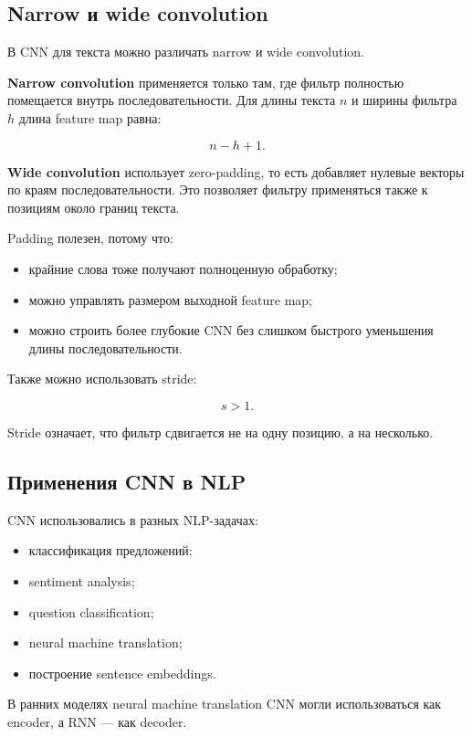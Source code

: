 \documentclass[a4paper,12pt]{article}
\begin{document}
\subsection{Narrow и wide convolution}

В CNN для текста можно различать narrow и wide convolution.

\textbf{Narrow convolution} применяется только там, где фильтр полностью помещается внутрь последовательности. Для длины текста \(n\) и ширины фильтра \(h\) длина feature map равна:

\[
n - h + 1.
\]

\textbf{Wide convolution} использует zero-padding, то есть добавляет нулевые векторы по краям последовательности. Это позволяет фильтру применяться также к позициям около границ текста.

Padding полезен, потому что:

\begin{itemize}
    \item крайние слова тоже получают полноценную обработку;
    \item можно управлять размером выходной feature map;
    \item можно строить более глубокие CNN без слишком быстрого уменьшения длины последовательности.
\end{itemize}

Также можно использовать stride:

\[
s > 1.
\]

Stride означает, что фильтр сдвигается не на одну позицию, а на несколько.

\subsection{Применения CNN в NLP}

CNN использовались в разных NLP-задачах:

\begin{itemize}
    \item классификация предложений;
    \item sentiment analysis;
    \item question classification;
    \item neural machine translation;
    \item построение sentence embeddings.
\end{itemize}

В ранних моделях neural machine translation CNN могли использоваться как encoder, а RNN --- как decoder.
\end{document}
